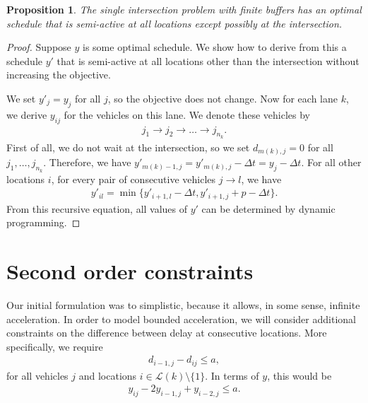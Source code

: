 \documentclass{article}
\theoremstyle{definition}
\theoremstyle{plain}
\newtheorem{proposition}{Proposition}[section]
\begin{document}
\begin{proposition}
  The single intersection problem with finite buffers has an optimal schedule
  that is semi-active at all locations except possibly at the intersection.
\end{proposition}
\begin{proof}
  Suppose $y$ is some optimal schedule. We show how to derive from this a
  schedule $y'$ that is semi-active at all locations other than the intersection
  without increasing the objective.

  We set $y'_{j} = y_{j}$ for all $j$, so the objective does not change. Now for
  each lane $k$, we derive $y_{ij}$ for the vehicles on this lane. We denote
  these vehicles by
  \begin{align*}
    j_{1} \rightarrow j_{2} \rightarrow \dots \rightarrow j_{n_{k}} .
  \end{align*}
  First of all, we do not wait at the intersection, so we set $d_{m(k), j} = 0$
  for all $j_{1},\dots, j_{n_{k}}$. Therefore, we have
  $y'_{m(k)-1,j} = y'_{m(k),j} - \Delta t = y_{j} - \Delta t$. For all other
  locations $i$, for every pair of consecutive vehicles $j \rightarrow l$, we
  have
  \begin{align*}
    y'_{il} = \min \{ y'_{i+1, l} - \Delta t, y'_{i+1, j} + p - \Delta t  \}.
  \end{align*}
  From this recursive equation, all values of $y'$ can be determined by dynamic
  programming.
\end{proof}


\section{Second order constraints}

Our initial formulation was to simplistic, because it allows, in some sense, infinite acceleration.
In order to model bounded acceleration, we will consider additional constraints on the difference between delay at consecutive locations.
More specifically, we require
\begin{align*}
  d_{i-1,j} - d_{ij} \leq a ,
\end{align*}
for all vehicles $j$ and locations $i \in \mathcal{L}(k) \setminus \{ 1 \}$.
In terms of $y$, this would be
\begin{align*}
  y_{ij} - 2 y_{i-1,j} + y_{i-2,j} \leq a .
\end{align*}
\end{document}
